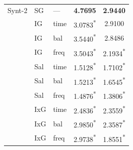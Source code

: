 \begin{table}[t]
\begin{tabular}{@{}lllcc@{}}
\midrule
Synt-2 & SG & --- & \textbf{4.7695} & \textbf{2.9440} \\
 & IG & time & 3.0783\textsuperscript{*} & 2.9100 \\
 & IG & bal & 3.5440\textsuperscript{*} & 2.8486 \\
 & IG & freq & 3.5043\textsuperscript{*} & 2.1934\textsuperscript{*} \\
 & Sal & time & 1.5128\textsuperscript{*} & 1.7102\textsuperscript{*} \\
 & Sal & bal & 1.5213\textsuperscript{*} & 1.6545\textsuperscript{*} \\
 & Sal & freq & 1.4876\textsuperscript{*} & 1.3806\textsuperscript{*} \\
 & IxG & time & 2.4836\textsuperscript{*} & 2.3559\textsuperscript{*} \\
 & IxG & bal & 2.9850\textsuperscript{*} & 2.3587\textsuperscript{*} \\
 & IxG & freq & 2.9738\textsuperscript{*} & 1.8551\textsuperscript{*} \\
\bottomrule
\end{tabular}
\end{table}
